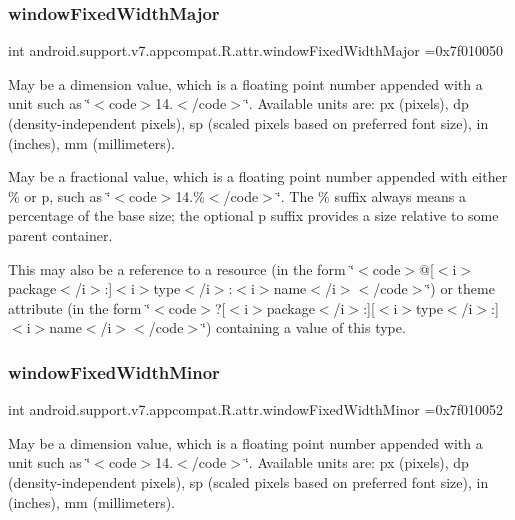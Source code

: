 \subsubsection{\texorpdfstring{window\+Fixed\+Width\+Major}{windowFixedWidthMajor}}
{\footnotesize\ttfamily int android.\+support.\+v7.\+appcompat.\+R.\+attr.\+window\+Fixed\+Width\+Major =0x7f010050\hspace{0.3cm}{\ttfamily [static]}}

May be a dimension value, which is a floating point number appended with a unit such as \char`\"{}$<$code$>$14.\+5sp$<$/code$>$\char`\"{}. Available units are\+: px (pixels), dp (density-\/independent pixels), sp (scaled pixels based on preferred font size), in (inches), mm (millimeters). 

May be a fractional value, which is a floating point number appended with either \% or p, such as \char`\"{}$<$code$>$14.\%$<$/code$>$\char`\"{}. The \% suffix always means a percentage of the base size; the optional p suffix provides a size relative to some parent container. 

This may also be a reference to a resource (in the form \char`\"{}$<$code$>$@\mbox{[}$<$i$>$package$<$/i$>$\+:\mbox{]}$<$i$>$type$<$/i$>$\+:$<$i$>$name$<$/i$>$$<$/code$>$\char`\"{}) or theme attribute (in the form \char`\"{}$<$code$>$?\mbox{[}$<$i$>$package$<$/i$>$\+:\mbox{]}\mbox{[}$<$i$>$type$<$/i$>$\+:\mbox{]}$<$i$>$name$<$/i$>$$<$/code$>$\char`\"{}) containing a value of this type. \mbox{\label{classandroid_1_1support_1_1v7_1_1appcompat_1_1R_1_1attr_a4959f1dee20f8e0c30bc87c8400018d8}} 
\subsubsection{\texorpdfstring{window\+Fixed\+Width\+Minor}{windowFixedWidthMinor}}
{\footnotesize\ttfamily int android.\+support.\+v7.\+appcompat.\+R.\+attr.\+window\+Fixed\+Width\+Minor =0x7f010052\hspace{0.3cm}{\ttfamily [static]}}

May be a dimension value, which is a floating point number appended with a unit such as \char`\"{}$<$code$>$14.\+5sp$<$/code$>$\char`\"{}. Available units are\+: px (pixels), dp (density-\/independent pixels), sp (scaled pixels based on preferred font size), in (inches), mm (millimeters). 

